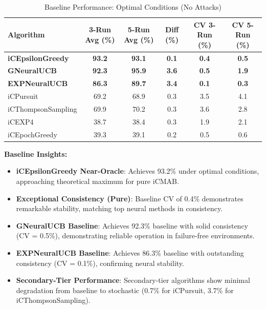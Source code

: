 \documentclass[12pt,a4paper]{article}
\newcommand{\primarytext}[1]{\textcolor{primaryblue}{\textbf{#1}}}
\newcommand{\secondarytext}[1]{\textcolor{secondaryblue}{\textbf{#1}}}
\newcommand{\legacy}[1]{\textcolor{legacycolor}{\textbf{#1}}}
\newcommand{\neural}[1]{\textcolor{neuralcolor}{\textbf{#1}}}
\begin{document}
\begin{table}[H]
\centering
\caption{Baseline Performance: Optimal Conditions (No Attacks)}
\label{tab:baseline-performance}
\begin{tabular}{@{}lccccc@{}}
\toprule
\textbf{Algorithm} & \textbf{3-Run Avg (\%)} & \textbf{5-Run Avg (\%)} & \textbf{Diff (\%)} & \textbf{CV 3-Run (\%)} & \textbf{CV 5-Run (\%)} \\
\midrule
\primarytext{iCEpsilonGreedy}   & \primarytext{93.2} & \primarytext{93.1} & \primarytext{0.1} & \primarytext{0.4} & \primarytext{0.5} \\
\neural{GNeuralUCB}            & \neural{92.3} & \neural{95.9} & \neural{3.6} & \neural{0.5} & \neural{1.9} \\
\legacy{EXPNeuralUCB}           & \legacy{86.3} & \legacy{89.7} & \legacy{3.4} & \legacy{0.1} & \legacy{0.3} \\
iCPursuit                       & 69.2 & 68.9 & 0.3 & 3.5 & 4.1 \\
iCThompsonSampling              & 69.9 & 70.2 & 0.3 & 3.6 & 2.8 \\
iCEXP4                          & 38.7 & 38.4 & 0.3 & 1.9 & 2.1 \\
iCEpochGreedy                   & 39.3 & 39.1 & 0.2 & 0.5 & 0.6 \\
\bottomrule
\end{tabular}
\end{table}

\textbf{Baseline Insights:}
\begin{itemize}
\item \primarytext{iCEpsilonGreedy Near-Oracle}: Achieves 93.2\% under optimal conditions, approaching theoretical maximum for pure iCMAB.
\item \primarytext{Exceptional Consistency (Pure)}: Baseline CV of 0.4\% demonstrates remarkable stability, matching top neural methods in consistency.
\item \neural{GNeuralUCB Baseline}: Achieves 92.3\% baseline with solid consistency (CV = 0.5\%), demonstrating reliable operation in failure-free environments.
\item \legacy{EXPNeuralUCB Baseline}: Achieves 86.3\% baseline with outstanding consistency (CV = 0.1\%), confirming neural stability.
\item \secondarytext{Secondary-Tier Performance}: Secondary-tier algorithms show minimal degradation from baseline to stochastic (0.7\% for iCPursuit, 3.7\% for iCThompsonSampling).
\end{itemize}
\end{document}
